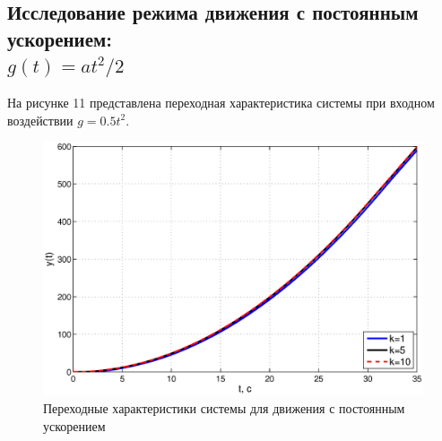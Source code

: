 \documentclass[12pt,a4paper]{article}
\begin{document}
\subsection{Исследование режима движения с постоянным ускорением: \\$g(t)=at^2/2$} 
На рисунке 11 представлена переходная характеристика системы при входном воздействии $g=0.5t^2$.
\begin{figure}[H]
	\centering
	\includegraphics[width=0.95\linewidth]{2.3.eps}
	\caption{Переходные характеристики системы для движения с постоянным ускорением}
\end{figure}
\end{document}
